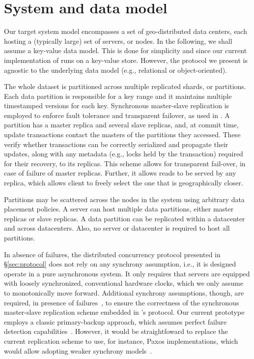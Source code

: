 \section{System  and data  model}
\label{sec:overview}

Our target system model encompasses a set of geo-distributed data centers, each hosting a (typically large) set of servers, or nodes. In the following, we shall assume a key-value data model. This is done for simplicity and since  our current implementation of \specula runs on a key-value store. However, the protocol we present  is agnostic to the underlying data model (e.g., relational or object-oriented). 

The whole dataset is partitioned across multiple replicated shards, or partitions.
Each data partition is responsible for a key range and it maintains multiple timestamped versions for each key.  Synchronous master-slave replication is employed to enforce fault tolerance and transparent failover, as used in \cite{spanner, baker2011megastore}. A partition has a master replica and several slave replicas, and, at commit time, update transactions contact the masters of the partitions they accessed. These verify whether transactions can be correctly serialized  and propagate their updates, along with any metadata (e.g., locks held by the transaction) required for their recovery, to its replicas.
This scheme allows for transparent fail-over, in case of failure of master replicas. Further, it allows reads to be served by any replica, which allows client to freely select the one that is geographically closer.


Partitions may be scattered across the nodes in the system using arbitrary data placement policies. A server can host multiple data partitions, either master replicas or slave replicas. A data partition can be replicated within a datacenter and across datacenters. Also, no server or datacenter is required to host all partitions. 

In absence of failures, the distributed concurrency protocol presented in \S \ref{sec:protocol} does not rely on any synchrony assumption, i.e., it is designed operate in a pure asynchronous system. It only requires that  servers are equipped with loosely synchronized, conventional hardware clocks, which we only assume to monotonically move forward. Additional synchrony assumptions, though, are required,  in presence of failures~\cite{fischer1985impossibility}, to ensure the correctness of the synchronous master-slave replication scheme embedded in \specula's protocol. Our current prototype employs a classic primary-backup approach, which assumes perfect failure detection capabilities~\cite{chandra1996unreliable}. However, it would be straightfoward to replace the current replication scheme to use, for instance, Paxos implementations, which would allow adopting weaker synchrony models~\cite{dwork1988consensus}.


